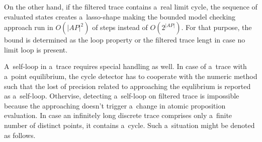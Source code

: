 \documentclass[12pt,oneside,draft]{fithesis}
\begin{document}
On the other hand, if the filtered trace contains a~real limit cycle,
the sequence of evaluated states creates a~lasso-shape making the
bounded model checking approach run in $O(|AP|^2)$ of steps
instead of $O(2^{|AP|})$\cite{biere}. For that purpose, the bound is
determined as the loop property or the filtered trace lengt in case
no limit loop is present.

A~self-loop in a~trace requires special handling as well. In case of
a~trace with a~point equilibrium, the cycle detector has to cooperate
with the numeric method such that the lost of precision related to
approaching the equlibrium is reported as a~self-loop. Othervise,
detecting a~self-loop on filtered trace is impossible because the
approaching doesn't trigger a~change in atomic proposition evaluation.
In case an infinitely long discrete trace comprises only a~finite number
of distinct points, it contains a~cycle. Such a~situation might be
denoted as follows\cite{biere}.
\end{document}
